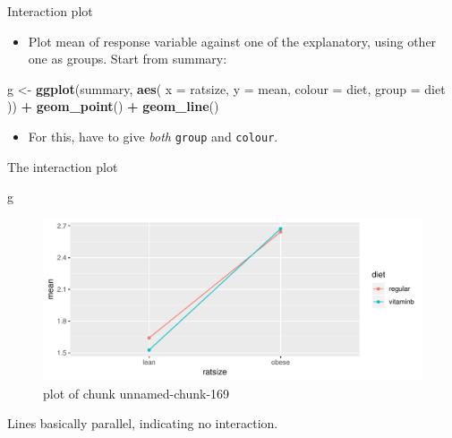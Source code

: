 \documentclass[ignorenonframetext,]{beamer}
\newenvironment{Shaded}{\begin{snugshade}}{\end{snugshade}}
\newcommand{\DataTypeTok}[1]{\textcolor[rgb]{0.13,0.29,0.53}{#1}}
\newcommand{\KeywordTok}[1]{\textcolor[rgb]{0.13,0.29,0.53}{\textbf{#1}}}
\newcommand{\NormalTok}[1]{#1}
\newcommand{\OperatorTok}[1]{\textcolor[rgb]{0.81,0.36,0.00}{\textbf{#1}}}
\newcommand{\StringTok}[1]{\textcolor[rgb]{0.31,0.60,0.02}{#1}}
\providecommand{\tightlist}{%
  \setlength{\itemsep}{0pt}\setlength{\parskip}{0pt}}
\begin{document}
\begin{frame}[fragile]{Interaction plot}
\protect\hypertarget{interaction-plot}{}

\begin{itemize}
\tightlist
\item
  Plot mean of response variable against one of the explanatory, using
  other one as groups. Start from summary:
\end{itemize}

\begin{Shaded}
\begin{Highlighting}[]
\NormalTok{g <-}\StringTok{ }\KeywordTok{ggplot}\NormalTok{(summary, }\KeywordTok{aes}\NormalTok{(}
  \DataTypeTok{x =}\NormalTok{ ratsize, }\DataTypeTok{y =}\NormalTok{ mean,}
  \DataTypeTok{colour =}\NormalTok{ diet, }\DataTypeTok{group =}\NormalTok{ diet}
\NormalTok{)) }\OperatorTok{+}
\StringTok{  }\KeywordTok{geom_point}\NormalTok{() }\OperatorTok{+}\StringTok{ }\KeywordTok{geom_line}\NormalTok{()}
\end{Highlighting}
\end{Shaded}

\begin{itemize}
\tightlist
\item
  For this, have to give \emph{both} \texttt{group} and \texttt{colour}.
\end{itemize}

\end{frame}

\begin{frame}[fragile]{The interaction plot}
\protect\hypertarget{the-interaction-plot}{}

\begin{Shaded}
\begin{Highlighting}[]
\NormalTok{g}
\end{Highlighting}
\end{Shaded}

\begin{figure}
\centering
\includegraphics{figure/unnamed-chunk-169-1.pdf}
\caption{plot of chunk unnamed-chunk-169}
\end{figure}

Lines basically parallel, indicating no interaction.

\end{frame}
\end{document}
